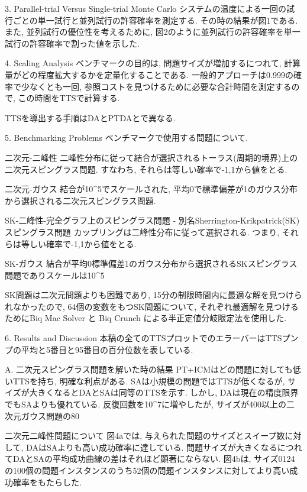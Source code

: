 3. Parallel-trial Versus Single-trial Monte Carlo
システムの温度による一回の試行ごとの単一試行と並列試行の許容確率を測定する. 
その時の結果が図1である. 
また, 並列試行の優位性を考えるために, 図2のように並列試行の許容確率を単一試行の許容確率で割った値を示した. 

4. Scaling Analysis
ベンチマークの目的は, 問題サイズが増加するにつれて, 計算量がどの程度拡大するかを定量化することである. 
一般的アプローチは0.999の確率で少なくとも一回, 参照コストを見つけるために必要な合計時間を測定するので, この時間をTTSで計算する. 

TTSを導出する手順はDAとPTDAとで異なる. 

5. Benchmarking Problems
ベンチマークで使用する問題について. 

二次元-二峰性
  二峰性分布に従って結合が選択されるトーラス(周期的境界)上の二次元スピングラス問題. すなわち, それらは等しい確率で{-1,1}から値をとる. 
  
二次元-ガウス
  結合が10^5でスケールされた, 平均0で標準偏差が1のガウス分布から選択される二次元スピングラス問題. 
  
SK-二峰性-完全グラフ上のスピングラス問題 - 別名Sherrington-Krikpatrick(SK)スピングラス問題
  カップリングは二峰性分布に従って選択される. つまり, それらは等しい確率で{-1,1}から値をとる. 
  
SK-ガウス
  結合が平均0標準偏差1のガウス分布から選択されるSKスピングラス問題でありスケールは10^5

SK問題は二次元問題よりも困難であり, 15分の制限時間内に最適な解を見つけられなかったので, 64個の変数をもつSK問題について, それぞれ最適解を見つけるためにBiq Mac Solver と Biq Crunch による半正定値分岐限定法を使用した. 

6. Results and Discussion
本稿の全てのTTSプロットでのエラーバーはTTSプンプの平均と5番目と95番目の百分位数を表している. 

A. 二次元スピングラス問題を解いた時の結果
PT+ICMはどの問題に対しても低いTTSを持ち, 明確な利点がある. 
SAは小規模の問題ではTTSが低くなるが, サイズが大きくなるとDAとSAは同等のTTSを示す. 
しかし, DAは現在の精度限界でもSAよりも優れている. 
反復回数を10^7に増やしたが, サイズが400以上の二次元ガウス問題の80%

二次元二峰性問題について
図4aでは, 与えられた問題のサイズとスイープ数に対して, DAはSAよりも高い成功確率に達している. 
問題サイズが大きくなるにつれてDAとSAの平均成功曲線の差はそれほど顕著にならない. 
図4bは, サイズ0124の100個の問題インスタンスのうち52個の問題インスタンスに対してより高い成功確率をもたらした. 


